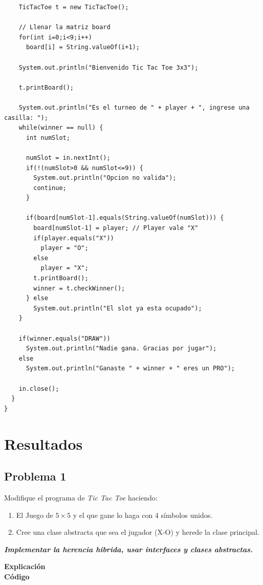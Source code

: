 \documentclass[11pt, twocolumn]{article}
\newcommand{\linejump}{\hfill \break}
\begin{document}
\begin{lstlisting}
    TicTacToe t = new TicTacToe();

    // Llenar la matriz board
    for(int i=0;i<9;i++)
      board[i] = String.valueOf(i+1);

    System.out.println("Bienvenido Tic Tac Toe 3x3");

    t.printBoard();

    System.out.println("Es el turneo de " + player + ", ingrese una casilla: ");
    while(winner == null) {
      int numSlot;

      numSlot = in.nextInt();
      if(!(numSlot>0 && numSlot<=9)) {
        System.out.println("Opcion no valida");
        continue;
      }

      if(board[numSlot-1].equals(String.valueOf(numSlot))) {
        board[numSlot-1] = player; // Player vale "X"
        if(player.equals("X"))
          player = "O";
        else
          player = "X";
        t.printBoard();
        winner = t.checkWinner();
      } else
        System.out.println("El slot ya esta ocupado");
    }

    if(winner.equals("DRAW"))
      System.out.println("Nadie gana. Gracias por jugar");
    else 
      System.out.println("Ganaste " + winner + " eres un PRO");

    in.close();
  }
}
  \end{lstlisting}

  \section*{Resultados}
  \subsection*{Problema 1}
  Modifique el programa de \textit{Tic Tac Toe} haciendo: 
  \begin{enumerate}[label=\alph*.]
    \item El Juego de $5\times 5$ y el que gane lo haga con $4$ símbolos unidos.
    \item Cree una clase abstracta que sea el jugador (X-O) y herede la clase principal.
  \end{enumerate}
  \textbf{\textit{Implementar la herencia hibrida, usar interfaces y clases abstractas.}}

  \linejump
  \textbf{Explicación} \\


  \textbf{Código}
    
\end{document}
